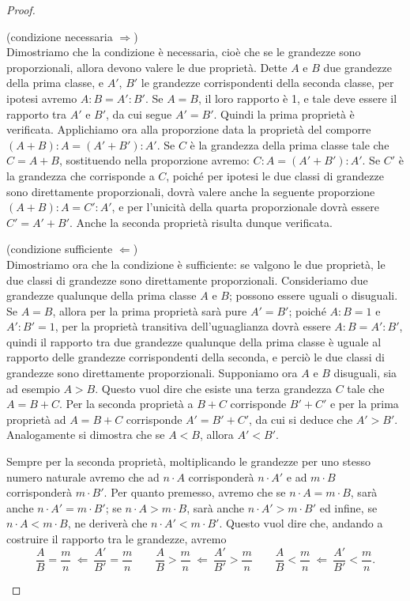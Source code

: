 \begin{proof}~\\
\begin{itemize*}
\item (condizione necessaria $\Rightarrow$)\\
Dimostriamo che la condizione è necessaria, cioè che se le grandezze sono proporzionali, allora devono valere le due proprietà.
Dette $A$ e $B$ due grandezze della prima classe, e $A'$, $B'$ le grandezze corrispondenti della seconda classe, per ipotesi avremo $A : B = A' : B'$.
Se $A=B$, il loro rapporto è 1, e tale deve essere il rapporto tra $A'$ e $B'$, da cui segue $A' = B'$.
Quindi la prima proprietà è verificata.
Applichiamo ora alla proporzione data la proprietà del comporre $(A + B) : A = (A' + B') : A'$.
Se $C$ è la grandezza della prima classe tale che $C = A + B$, sostituendo nella proporzione avremo:
$C : A = (A' + B') : A'$.
Se $C'$ è la grandezza che corrisponde a $C$, poiché per ipotesi le due classi di grandezze sono direttamente proporzionali, dovrà valere anche la seguente proporzione $(A + B) : A = C' : A'$, e per l'unicità della quarta proporzionale dovrà essere $C' = A' + B'$.
Anche la seconda proprietà risulta dunque verificata.
\item (condizione sufficiente $\Leftarrow$)\\
Dimostriamo ora che la condizione è sufficiente:  se valgono le due proprietà, le due classi di grandezze sono direttamente proporzionali.
Consideriamo due grandezze qualunque della prima classe $A$ e $B$; possono essere uguali o disuguali.
Se $A = B$, allora per la prima proprietà sarà pure $A' = B'$; poiché $A : B = 1$ e $A' : B' = 1$, per la proprietà transitiva dell'uguaglianza dovrà essere $A : B = A' : B'$, quindi il rapporto tra due grandezze qualunque della prima classe è uguale al rapporto delle grandezze corrispondenti della seconda, e perciò le due classi di grandezze sono direttamente proporzionali.
Supponiamo ora $A$ e $B$ disuguali, sia ad esempio $A > B$. Questo vuol dire che esiste una terza grandezza $C$ tale che $A = B + C$. Per la seconda proprietà a $B + C$ corrisponde $B' + C'$ e per la prima proprietà ad $A = B + C$ corrisponde $A' = B' + C'$, da cui si deduce che $A' > B'$.
Analogamente si dimostra che se $A < B$, allora $A' < B'$.

Sempre per la seconda proprietà, moltiplicando le grandezze per uno stesso numero naturale avremo che ad $n\cdot A$ corrisponderà $n\cdot A'$ e ad $m\cdot B$ corrisponderà $m\cdot B'$. Per quanto premesso, avremo che se $n\cdot A = m\cdot B$, sarà anche $n\cdot A' = m\cdot B'$; se $n\cdot A > m\cdot B$, sarà anche $n\cdot A' > m\cdot B'$ ed infine, se $n\cdot A < m\cdot B$, ne deriverà che $n\cdot A' < m\cdot B'$.
Questo vuol dire che, andando a costruire il rapporto tra le grandezze, avremo
\[\dfrac{A}{B} = \dfrac{m}{n} \:\Leftarrow\: \dfrac{A'}{B'} = \dfrac{m}{n}\qquad \dfrac{A}{B} > \dfrac{m}{n} \:\Leftarrow\: \dfrac{A'}{B'} > \dfrac{m}{n}\qquad \dfrac{A}{B} < \dfrac{m}{n} \:\Leftarrow\: \dfrac{A'}{B'} < \dfrac{m}{n}.\]
 

\end{itemize*}
\end{proof}
